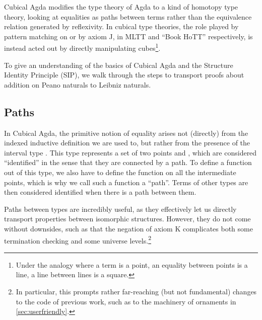 Cubical Agda modifies the type theory of Agda to a kind of homotopy type theory, looking at equalities as paths between terms rather than the equivalence relation generated by reflexivity. In cubical type theories, the role played by pattern matching on  or by axiom J, in MLTT and ``Book HoTT'' respectively, is instead acted out by directly manipulating cubes\footnote{Under the analogy where a term is a point, an equality between points is a line, a line between lines is a square.}. %

To give an understanding of the basics of Cubical Agda \cite{cuagda} and the Structure Identity Principle (SIP), we walk through the steps to transport proofs about addition on Peano naturals to Leibniz naturals. %

\subsection{Paths}
In Cubical Agda, the primitive notion of equality arises not (directly) from the indexed inductive definition we are used to, but rather from the presence of the interval type . This type represents a set of two points  and , which are considered ``identified'' in the sense that they are connected by a path. To define a function out of this type, we also have to define the function on all the intermediate points, which is why we call such a function a ``path''. Terms of other types are then considered identified when there is a path between them.

Paths between types are incredibly useful, as they effectively let us directly transport properties between isomorphic structures. However, they do not come without downsides, such as that the negation of axiom K complicates both some termination checking and some universe levels.\footnote{In particular, this prompts rather far-reaching (but not fundamental) changes to the code of previous work, such as to the machinery of ornaments \cite{progorn} in \autoref{sec:userfriendly}.} %

